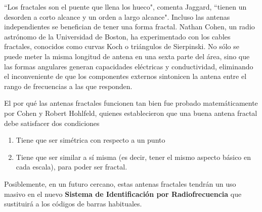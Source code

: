 \begin{example}
``Los fractales son el puente que llena los hueco", comenta Jaggard, ``tienen un desorden a corto alcance y un orden a largo alcance". Incluso las antenas independientes se benefician de tener una forma fractal. Nathan Cohen, un radio astrónomo de la Universidad de Boston, ha experimentado con los cables fractales, conocidos como curvas Koch o triángulos de Sierpinski. No sólo se puede meter la misma longitud de antena en una sexta parte del área, sino que las formas angulares generan capacidades eléctricas y conductividad, eliminando el inconveniente de que los componentes externos sintonicen la antena entre el rango de frecuencias a las que responden.

El por qué las antenas fractales funcionen tan bien fue probado matemáticamente por Cohen y Robert Hohlfeld, quienes establecieron que una buena antena fractal debe satisfacer dos condiciones
\begin{enumerate}
\item Tiene que ser simétrica con respecto a un punto
\item Tiene que ser similar a sí misma (es decir, tener el mismo aspecto básico en cada escala), para poder ser fractal.
\end{enumerate}

Posiblemente, en un futuro cercano, estas antenas fractales tendrán un uso masivo en el nuevo \textbf{Sistema de Identificación por Radiofrecuencia} que sustituirá a los códigos de barras habituales.
\end{example}

